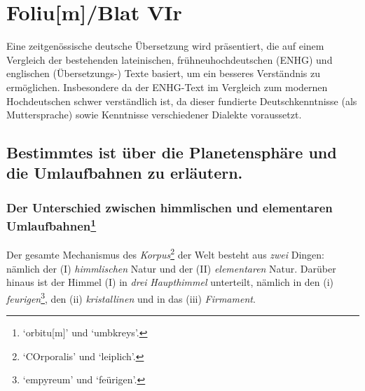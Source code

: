 \documentclass[
]{article}
\author{Dietmar Gerald Schrausser}
\date{09.05.2026}
\begin{document}
\hypertarget{foliumblat-vir}{%
\section{Foliu{[}m{]}/Blat VIr}\label{foliumblat-vir}}

Eine zeitgenössische deutsche Übersetzung wird präsentiert, die auf
einem Vergleich der bestehenden lateinischen, frühneuhochdeutschen
(ENHG) und englischen (Übersetzungs-) Texte basiert, um ein besseres
Verständnis zu ermöglichen. Insbesondere da der ENHG-Text im Vergleich
zum modernen Hochdeutschen schwer verständlich ist, da dieser fundierte
Deutschkenntnisse (als Muttersprache) sowie Kenntnisse verschiedener
Dialekte voraussetzt.

\hypertarget{bestimmtes-ist-uxfcber-die-planetensphuxe4re-und-die-umlaufbahnen-zu-erluxe4utern.}{%
\subsection{Bestimmtes ist über die Planetensphäre und die Umlaufbahnen
zu
erläutern.}\label{bestimmtes-ist-uxfcber-die-planetensphuxe4re-und-die-umlaufbahnen-zu-erluxe4utern.}}

\hypertarget{der-unterschied-zwischen-himmlischen-und-elementaren-umlaufbahnen1}{%
\subsubsection[Der Unterschied zwischen himmlischen und elementaren
Umlaufbahnen]{\texorpdfstring{Der Unterschied zwischen himmlischen und
elementaren
Umlaufbahnen\footnote{`orbitu{[}m{]}' und `umbkreys'.}}{Der Unterschied zwischen himmlischen und elementaren Umlaufbahnen}}\label{der-unterschied-zwischen-himmlischen-und-elementaren-umlaufbahnen1}}

Der gesamte Mechanismus des \emph{Korpus}\footnote{`COrporalis' und
  `leiplich'.} der Welt besteht aus \emph{zwei} Dingen: nämlich der (I)
\emph{himmlischen} Natur und der (II) \emph{elementaren} Natur. Darüber
hinaus ist der Himmel (I) in \emph{drei} \emph{Haupthimmel} unterteilt,
nämlich in den (i) \emph{feurigen}\footnote{`empyreum' und `feürigen'.},
den (ii) \emph{kristallinen} und in das (iii) \emph{Firmament}.
\end{document}
